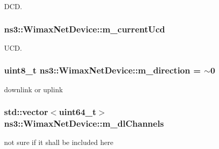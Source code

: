 D\+CD. 

\subsubsection[{\texorpdfstring{m\+\_\+current\+Ucd}{m_currentUcd}}]{ ns3\+::\+Wimax\+Net\+Device\+::m\+\_\+current\+Ucd\hspace{0.3cm}{\ttfamily [private]}}\hypertarget{classns3_1_1WimaxNetDevice_a0f63e53ca768ad55e7976a35dd0b3de0}{}\label{classns3_1_1WimaxNetDevice_a0f63e53ca768ad55e7976a35dd0b3de0}


U\+CD. 

\subsubsection[{\texorpdfstring{m\+\_\+direction}{m_direction}}]{\setlength{\rightskip}{0pt plus 5cm}uint8\+\_\+t ns3\+::\+Wimax\+Net\+Device\+::m\+\_\+direction = $\sim$0\hspace{0.3cm}{\ttfamily [static]}}\hypertarget{classns3_1_1WimaxNetDevice_a13a7a35e7cdf58018029f0809a1701a9}{}\label{classns3_1_1WimaxNetDevice_a13a7a35e7cdf58018029f0809a1701a9}


downlink or uplink 

\subsubsection[{\texorpdfstring{m\+\_\+dl\+Channels}{m_dlChannels}}]{\setlength{\rightskip}{0pt plus 5cm}std\+::vector$<$uint64\+\_\+t$>$ ns3\+::\+Wimax\+Net\+Device\+::m\+\_\+dl\+Channels\hspace{0.3cm}{\ttfamily [private]}}\hypertarget{classns3_1_1WimaxNetDevice_a158c8081d3581869c50f4de4efbdd620}{}\label{classns3_1_1WimaxNetDevice_a158c8081d3581869c50f4de4efbdd620}


not sure if it shall be included here 

